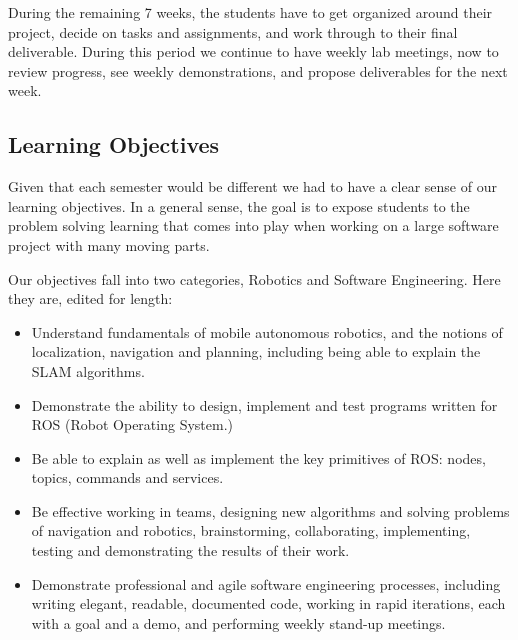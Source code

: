 During the remaining 7 weeks, the students have to get organized around their project, decide on tasks and assignments, and work through to their final deliverable. During this period we continue to have weekly lab meetings, now to review progress, see weekly demonstrations, and propose deliverables for the next week.

\subsection{Learning Objectives} Given that each semester would be different we had to have a clear sense of our learning objectives. In a general sense, the goal is to expose students to the problem solving learning that comes into play when working on a large software project with many moving parts.

Our objectives fall into two categories, Robotics and Software Engineering. Here they are, edited for length:

\begin{itemize}
\item Understand fundamentals of mobile autonomous robotics, and the notions of localization, navigation and planning, including being able to explain the SLAM algorithms.
\item Demonstrate the ability to design, implement and test programs written for ROS (Robot Operating System.) 
\item Be able to explain as well as implement the key primitives of ROS: nodes, topics, commands and services.
\item Be effective working in teams, designing new algorithms and solving problems of navigation and robotics, brainstorming, collaborating, implementing, testing and demonstrating the results of their work.
\item Demonstrate professional and agile software engineering processes, including writing elegant, readable, documented code, working in rapid iterations, each with a goal and a demo, and performing weekly stand-up\cite{standup} meetings.
\end{itemize}
